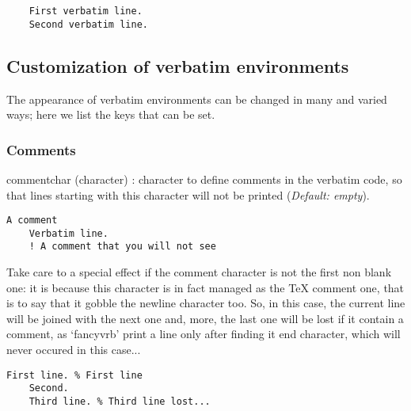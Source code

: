 \documentclass[twoside]{article}
\newcommand\FVrbPackage{`\textsf{fancyvrb}'}
\providecommand\optname[1]{\textsf{#1}}
\newenvironment{optlist}{\begin{description}%
  \renewcommand\makelabel[1]{%
    \descriptionlabel{\mdseries\optname{##1}}}%
  \itemsep0.25\itemsep}%
 {\end{description}}
\begin{document}
\begin{SideBySideExample}
  \begin{Verbatim}
    First verbatim line.
    Second verbatim line.
  \end{Verbatim}
\end{SideBySideExample}

\subsection{Customization of verbatim environments}

  The appearance of verbatim environments can be changed in many and
varied ways; here we list the keys that can be set. 

\subsubsection{Comments}

\begin{optlist}
  \item[commentchar (character)]: character to define comments in the
  verbatim code, so that lines starting with this character will not be
  printed (\emph{Default: empty}).
\end{optlist}

\begin{SideBySideExample}
  \begin{Verbatim}[commentchar=!]
    A comment
    Verbatim line.
    ! A comment that you will not see
  \end{Verbatim}
\end{SideBySideExample}

  Take care to a special effect if the comment character is not the first
non blank one: it is because this character is in fact managed as the \TeX{}
comment one, that is to say that it gobble the newline character too. So, in
this case, the current line will be joined with the next one and, more, the
last one will be lost if it contain a comment, as \FVrbPackage{} print a
line only after finding it end character, which will never occured in this
case...

\begin{SideBySideExample}
  \begin{Verbatim}[commentchar=\%]
    First line. % First line
    Second.
    Third line. % Third line lost...
  \end{Verbatim}
\end{SideBySideExample}
\end{document}
